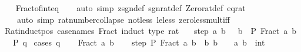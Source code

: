 \begin{isabellebody}
%
\isadelimproof
\ \ %
\endisadelimproof
%
\isatagproof
{}\isamarkupfalse%
\ Fract{\isacharunderscore}{\kern0pt}of{\isacharunderscore}{\kern0pt}int{\isacharunderscore}{\kern0pt}eq\isanewline
\ \ \isamarkupfalse%
\ {\isacharparenleft}{\kern0pt}auto\ simp{\isacharcolon}{\kern0pt}\ zsgn{\isacharunderscore}{\kern0pt}def\ sgn{\isacharunderscore}{\kern0pt}rat{\isacharunderscore}{\kern0pt}def\ Zero{\isacharunderscore}{\kern0pt}rat{\isacharunderscore}{\kern0pt}def\ eq{\isacharunderscore}{\kern0pt}rat{\isacharparenright}{\kern0pt}\isanewline
\ \ \ \ {\isacharparenleft}{\kern0pt}auto\ simp{\isacharcolon}{\kern0pt}\ rat{\isacharunderscore}{\kern0pt}number{\isacharunderscore}{\kern0pt}collapse\ not{\isacharunderscore}{\kern0pt}less\ le{\isacharunderscore}{\kern0pt}less\ zero{\isacharunderscore}{\kern0pt}less{\isacharunderscore}{\kern0pt}mult{\isacharunderscore}{\kern0pt}iff{\isacharparenright}{\kern0pt}%
\endisatagproof
{\isafoldproof}%
%
\isadelimproof
\isanewline
%
\endisadelimproof
\isanewline
{}\isamarkupfalse%
\ Rat{\isacharunderscore}{\kern0pt}induct{\isacharunderscore}{\kern0pt}pos\ {\isacharbrackleft}{\kern0pt}case{\isacharunderscore}{\kern0pt}names\ Fract{\isacharcomma}{\kern0pt}\ induct\ type{\isacharcolon}{\kern0pt}\ rat{\isacharbrackright}{\kern0pt}{\isacharcolon}{\kern0pt}\isanewline
\ \ \ step{\isacharcolon}{\kern0pt}\ {\isachardoublequoteopen}{\isasymAnd}a\ b{\isachardot}{\kern0pt}\ {}\ {\isacharless}{\kern0pt}\ b\ {\isasymLongrightarrow}\ P\ {\isacharparenleft}{\kern0pt}Fract\ a\ b{\isacharparenright}{\kern0pt}{\isachardoublequoteclose}\isanewline
\ \ \ {\isachardoublequoteopen}P\ q{\isachardoublequoteclose}\isanewline
%
\isadelimproof
%
\endisadelimproof
%
\isatagproof
{}\isamarkupfalse%
\ {\isacharparenleft}{\kern0pt}cases\ q{\isacharparenright}{\kern0pt}\isanewline
\ \ \isamarkupfalse%
\ {\isacharparenleft}{\kern0pt}Fract\ a\ b{\isacharparenright}{\kern0pt}\isanewline
\ \ \isamarkupfalse%
\ step{\isacharprime}{\kern0pt}{\isacharcolon}{\kern0pt}\ {\isachardoublequoteopen}P\ {\isacharparenleft}{\kern0pt}Fract\ a\ b{\isacharparenright}{\kern0pt}{\isachardoublequoteclose}\ \ b{\isacharcolon}{\kern0pt}\ {\isachardoublequoteopen}b\ {\isacharless}{\kern0pt}\ {}{\isachardoublequoteclose}\ \ a\ b\ {\isacharcolon}{\kern0pt}{\isacharcolon}{\kern0pt}\ int\isanewline
\ \ \isamarkupfalse%
\ {\isacharminus}{\kern0pt}\isanewline
\ \ \ \ \isamarkupfalse%

\end{isabellebody}
